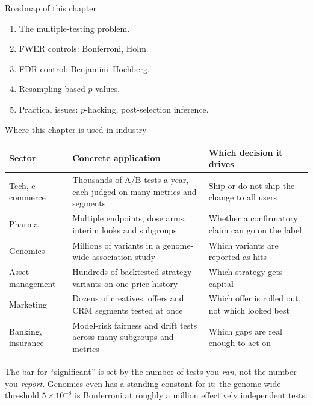 \documentclass[aspectratio=169,11pt]{beamer}
\begin{document}
\begin{frame}{Roadmap of this chapter}
  \begin{takeaway}
    \begin{enumerate}
      \item The multiple-testing problem.
      \item FWER controls: Bonferroni, Holm.
      \item FDR control: Benjamini--Hochberg.
      \item Resampling-based $p$-values.
      \item Practical issues: $p$-hacking, post-selection inference.
    \end{enumerate}
  \end{takeaway}
\end{frame}

\begin{frame}{Where this chapter is used in industry}
  \scriptsize
  \begin{center}
  \begin{tabular}{@{}p{2.6cm}p{5.2cm}p{4.6cm}@{}}
    \toprule
    \textbf{Sector} & \textbf{Concrete application} & \textbf{Which decision it drives} \\
    \midrule
    Tech, e-commerce & Thousands of A/B tests a year, each judged on many metrics
      and segments & Ship or do not ship the change to all users \\
    Pharma & Multiple endpoints, dose arms, interim looks and subgroups &
      Whether a confirmatory claim can go on the label \\
    Genomics & Millions of variants in a genome-wide association study &
      Which variants are reported as hits \\
    Asset management & Hundreds of backtested strategy variants on one price history &
      Which strategy gets capital \\
    Marketing & Dozens of creatives, offers and CRM segments tested at once &
      Which offer is rolled out, not which looked best \\
    Banking, insurance & Model-risk fairness and drift tests across many subgroups and
      metrics & Which gaps are real enough to act on \\
    \bottomrule
  \end{tabular}
  \end{center}
  \begin{industry}
    The bar for ``significant'' is set by the number of tests you \emph{ran}, not the number
    you \emph{report}. Genomics even has a standing constant for it: the genome-wide
    threshold $5\times10^{-8}$ is Bonferroni at roughly a million effectively independent
    tests.
  \end{industry}
\end{frame}
\end{document}

